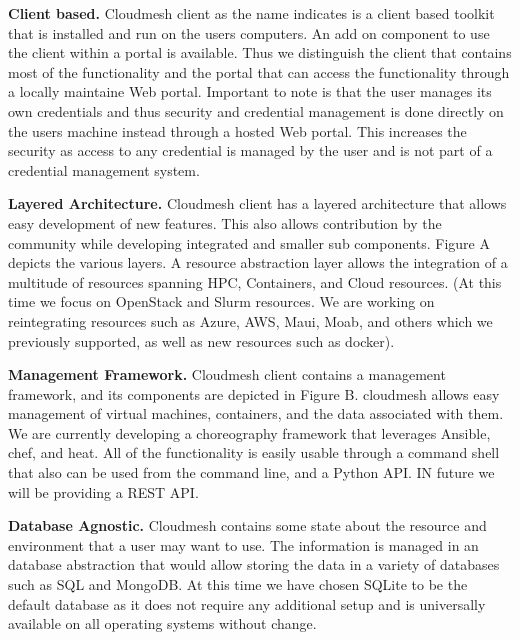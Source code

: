\begin{description}

\item{\bf Client based.} Cloudmesh client as the name indicates is a
  client based toolkit that is installed and run on the users
  computers. An add on component to use the client within a portal is
  available. Thus we distinguish the client that contains most of the
  functionality and the portal that can access the functionality
  through a locally maintaine Web portal. Important to note is that
  the user manages its own credentials and thus security and
  credential management is done directly on the users machine instead
  through a hosted Web portal. This increases the security as access
  to any credential is managed by the user and is not part of a
  credential management system.

\item{\bf Layered Architecture.} Cloudmesh client has a layered
architecture that allows easy development of new features. This also
allows contribution by the community while developing integrated and
smaller sub components. Figure A depicts the various layers. A
resource abstraction layer allows the integration of a multitude of
resources spanning HPC, Containers, and Cloud resources. (At this time
we focus on OpenStack and Slurm resources. We are working on
reintegrating resources such as Azure, AWS, Maui, Moab, and others
which we previously supported, as well as new resources such as
docker).

\item{\bf Management Framework.} Cloudmesh client contains a
management framework, and its components are depicted in Figure
B. cloudmesh allows easy management of virtual machines, containers,
and the data associated with them. We are currently developing a
choreography framework that leverages Ansible, chef, and heat. All of
the functionality is easily usable through a command shell that also
can be used from the command line, and a Python API. IN future we will
be providing a REST API.

\item{\bf Database Agnostic.} Cloudmesh contains some state about the
resource and environment that a user may want to use. The information
is managed in an database abstraction that would allow storing the
data in a variety of databases such as SQL and MongoDB. At this time
we have chosen SQLite to be the default database as it does not
require any additional setup and is universally available on all
operating systems without change.


\end{description}
